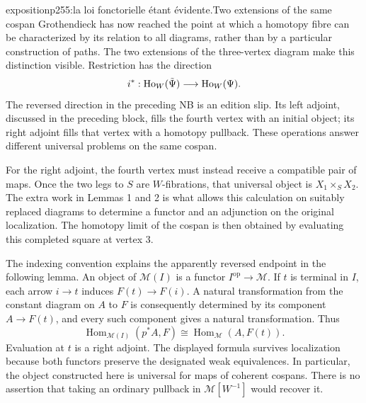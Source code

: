 \begin{dcomment}{exposition}{p255:la loi fonctorielle étant évidente.}{Two extensions of the same cospan}
Grothendieck has now reached the point at which a homotopy fibre can be characterized by its relation to all diagrams, rather than by a particular construction of paths. The two extensions of the three-vertex diagram make this distinction visible. Restriction has the direction
\[
 i^*: \mathrm{Ho}_W(\tilde\Psi)\longrightarrow\mathrm{Ho}_W(\Psi).
\]
The reversed direction in the preceding NB is an edition slip. Its left adjoint, discussed in the preceding block, fills the fourth vertex with an initial object; its right adjoint fills that vertex with a homotopy pullback. These operations answer different universal problems on the same cospan.

For the right adjoint, the fourth vertex must instead receive a compatible pair of maps. Once the two legs to $S$ are $W$-fibrations, that universal object is $X_1\times_S X_2$. The extra work in Lemmas 1 and 2 is what allows this calculation on suitably replaced diagrams to determine a functor and an adjunction on the original localization. The homotopy limit of the cospan is then obtained by evaluating this completed square at vertex 3.

The indexing convention explains the apparently reversed endpoint in the following lemma. An object of $\mathcal M(I)$ is a functor $I^{\mathrm{op}}\to\mathcal M$. If $t$ is terminal in $I$, each arrow $i\to t$ induces $F(t)\to F(i)$. A natural transformation from the constant diagram on $A$ to $F$ is consequently determined by its component $A\to F(t)$, and every such component gives a natural transformation. Thus
\[
 \operatorname{Hom}_{\mathcal M(I)}(p^*A,F)
 \cong \operatorname{Hom}_{\mathcal M}(A,F(t)).
\]
Evaluation at $t$ is a right adjoint. The displayed formula survives localization because both functors preserve the designated weak equivalences. In particular, the object constructed here is universal for maps of coherent cospans. There is no assertion that taking an ordinary pullback in $\mathcal M[W^{-1}]$ would recover it.
\end{dcomment}


